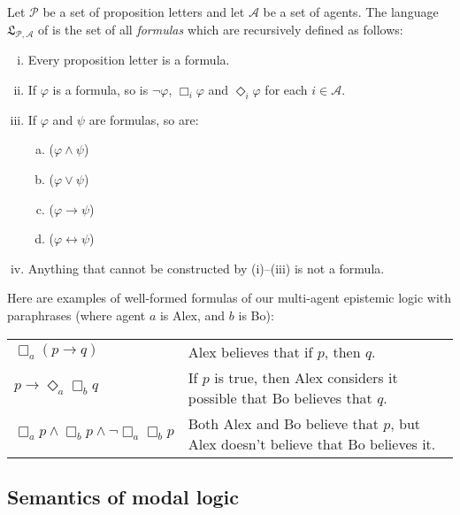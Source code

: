 \documentclass[nobib,nofonts]{tufte-handout}
\newcommand{\modlog}{\acro{ModLog}}
\begin{document}
Let $\mathcal{P}$ be a set of proposition letters and let $\mathcal{A}$ be a set of agents.
The language $\mathfrak{L}_{\mathcal{P},\mathcal{A}}$ of \modlog is the set of all \emph{formulas} which are recursively defined as follows:
\begin{enumerate}[(i)]
  \item Every proposition letter is a formula.
  \item If $\varphi$ is a formula, so is $\neg \varphi$, $\Box_{i} \varphi$ and $\Diamond_{i} \varphi$ for each $i \in \mathcal{A}$.
  \item If $\varphi$ and $\psi$ are formulas, so are:
        \vspace*{-0.4cm}
        \begin{multicols}{4}
          \begin{enumerate}[a.]
            \item ($\varphi \wedge \psi$)
            \item ($\varphi \vee \psi$)
            \item ($\varphi \rightarrow \psi$)
            \item ($\varphi \leftrightarrow \psi$)
          \end{enumerate}
        \end{multicols}
        \vspace*{-0.4cm}
  \item Anything that cannot be constructed by (i)--(iii) is not a formula.
\end{enumerate}


Here are examples of well-formed formulas of our multi-agent epistemic logic with paraphrases (where agent $a$ is Alex, and $b$ is Bo):
\begin{center}
  \begin{tabular}{ll}
    $\Box_{a} (p \rightarrow q)$
    & Alex believes that if $p$, then $q$.
    \\
    $p \rightarrow \Diamond_{a} \Box_{b} q$
    & If $p$ is true, then Alex considers it possible that Bo believes that $q$.
    \\
    $\Box_{a} p \wedge \Box_{b} p \wedge \neg \Box_{a} \Box_{b} p$
    & Both Alex and Bo believe that $p$, but Alex doesn't believe that Bo believes it.

  \end{tabular}
\end{center}

\subsection{Semantics of modal logic}
\end{document}
